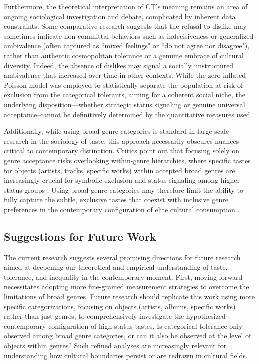 \documentclass[12pt]{article}
\begin{document}
Furthermore, the theoretical interpretation of CT's meaning remains an area of ongoing sociological investigation and debate, complicated by inherent data constraints. Some comparative research suggests that the refusal to dislike may sometimes indicate non-committal behaviors such as indecisiveness or generalized ambivalence (often captured as ``mixed feelings" or ``do not agree nor disagree"), rather than authentic cosmopolitan tolerance or a genuine embrace of cultural diversity. Indeed, the absence of dislikes may signal a socially unstructured ambivalence that increased over time in other contexts. While the zero-inflated Poisson model was employed to statistically separate the population at risk of exclusion from the categorical tolerants, aiming for a coherent social niche, the underlying disposition---whether strategic status signaling or genuine universal acceptance--cannot be definitively determined by the quantitative measures used.

Additionally, while using broad genre categories is standard in large-scale research in the sociology of taste, this approach necessarily obscures nuances critical to contemporary distinction. Critics point out that focusing solely on genre acceptance risks overlooking within-genre hierarchies, where specific tastes for objects (artists, tracks, specific works) within accepted broad genres are increasingly crucial for symbolic exclusion and status signaling among higher-status groups \citep{childress2019encultured-e58, nault2021social-1bf}. Using broad genre categories may therefore limit the ability to fully capture the subtle, exclusive tastes that coexist with inclusive genre preferences in the contemporary configuration of elite cultural consumption \citep{lizardo2024from-ddd}.

\subsection*{Suggestions for Future Work}
The current research suggests several promising directions for future research aimed at deepening our theoretical and empirical understanding of taste, tolerance, and inequality in the contemporary moment. First, moving forward necessitates adopting more fine-grained measurement strategies to overcome the limitations of broad genres. Future research should replicate this work using more specific categorizations, focusing on objects (artists, albums, specific works) rather than just genres, to comprehensively investigate the hypothesized contemporary configuration of high-status tastes. Is categorical tolerance only observed among broad genre categories, or can it also be observed at the level of objects within genres? Such refined analyses are increasingly relevant for understanding how cultural boundaries persist or are redrawn in cultural fields.
\end{document}
